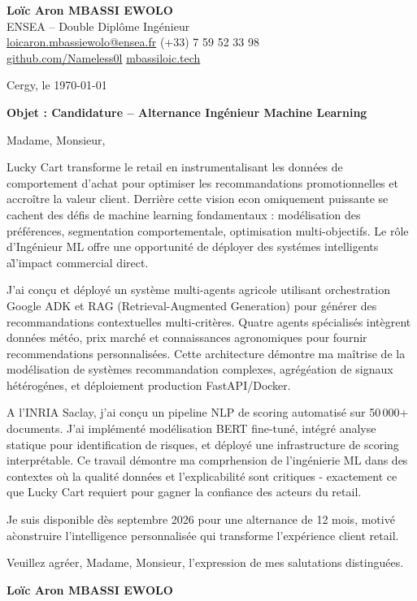 \documentclass[a4paper,11pt]{article}
\begin{document}
\noindent
\textbf{Lo\"ic Aron MBASSI EWOLO} \\
ENSEA -- Double Dipl\^ome Ing\'enieur \\
\href{mailto:loicaron.mbassiewolo@ensea.fr}{loicaron.mbassiewolo@ensea.fr} \quad (+33) 7 59 52 33 98 \\
\href{https://github.com/Nameless0l}{github.com/Nameless0l} \quad \href{https://mbassiloic.tech}{mbassiloic.tech}

\vspace{1em}
\noindent Cergy, le \today

\vspace{1em}
\noindent \textbf{Objet : Candidature -- Alternance Ing\'enieur Machine Learning}

\vspace{1.5em}
\noindent Madame, Monsieur,

\vspace{0.8em}
\noindent Lucky Cart transforme le retail en instrumentalisant les donn\'ees de comportement d'achat pour optimiser les recommandations promotionnelles et accroître la valeur client. Derrière cette vision econ omiquement puissante se cachent des d\'efis de machine learning fondamentaux : mod\'elisation des pr\'ef\'erences, segmentation comportementale, optimisation multi-objectifs. Le r\^ole d'Ing\'enieur ML offre une opportunit\'e de d\'eployer des syst\'emes intelligents a\` l'impact commercial direct.

\vspace{0.8em}
\noindent J'ai con\c{c}u et d\'eploy\'e un syst\`eme multi-agents agricole utilisant orchestration Google ADK et RAG (Retrieval-Augmented Generation) pour g\'en\'erer des recommandations contextuelles multi-crit\`eres. Quatre agents sp\'ecialis\'es int\`egrent donn\'ees m\'et\'eo, prix march\'e et connaissances agronomiques pour fournir recommendations personnalis\'ees. Cette architecture d\'emontre ma ma\^itrise de la mod\'elisation de syst\`emes recommandation complexes, agr\'eg\'eation de signaux h\'et\'erog\'enes, et d\'eploiement production FastAPI/Docker.

\vspace{0.8em}
\noindent A l'INRIA Saclay, j'ai con\c{c}u un pipeline NLP de scoring automatisé sur 50\,000+ documents. J'ai impl\'ement\'e mod\'elisation BERT fine-tun\'e, int\'egr\'e analyse statique pour identification de risques, et d\'eploy\'e une infrastructure de scoring interpr\'etable. Ce travail d\'emontre ma comprhension de l'ing\'enierie ML dans des contextes o\`u la qualit\'e donn\'ees et l'explicabilit\'e sont critiques - exactement ce que Lucky Cart requiert pour gagner la confiance des acteurs du retail.

\vspace{0.8em}
\noindent Je suis disponible d\`es septembre 2026 pour une alternance de 12 mois, motiv\'e a\` construire l'intelligence personnalisée qui transforme l'exp\'erience client retail.

\vspace{1.5em}
\noindent Veuillez agr\'eer, Madame, Monsieur, l'expression de mes salutations distingu\'ees.

\vspace{2em}
\noindent \textbf{Lo\"ic Aron MBASSI EWOLO}
\end{document}
